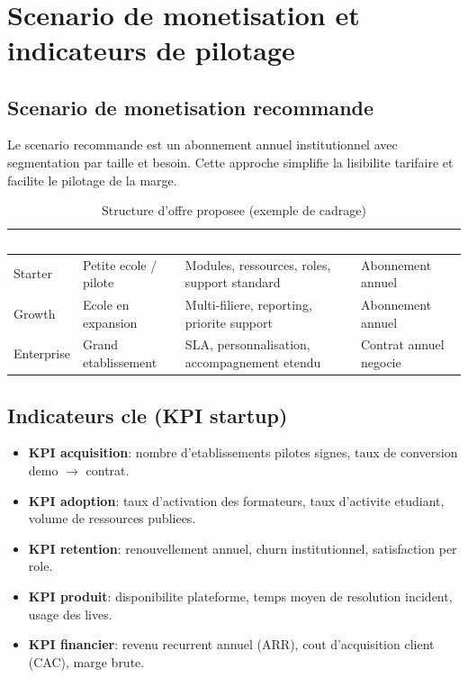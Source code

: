 ﻿﻿\documentclass[12pt,a4paper,oneside]{report}
\begin{document}
\section{Scenario de monetisation et indicateurs de pilotage}

\subsection{Scenario de monetisation recommande}

Le scenario recommande est un abonnement annuel institutionnel avec segmentation par taille et besoin. Cette approche simplifie la lisibilite tarifaire et facilite le pilotage de la marge.

\begin{table}[H]
\centering
\caption{Structure d'offre proposee (exemple de cadrage)}
\label{tab:offre_pricing}
\begin{tabular}{|p{3.2cm}|p{3.4cm}|p{4.0cm}|p{2.0cm}|}
\hline
\rowcolor{ustoblue}
\textcolor{white}{Formule} & \textcolor{white}{Cible} & \textcolor{white}{Valeur livree} & \textcolor{white}{Mode de prix} \\
\hline
Starter & Petite ecole / pilote & Modules, ressources, roles, support standard & Abonnement annuel \\
\hline
Growth & Ecole en expansion & Multi-filiere, reporting, priorite support & Abonnement annuel \\
\hline
Enterprise & Grand etablissement & SLA, personnalisation, accompagnement etendu & Contrat annuel negocie \\
\hline
\end{tabular}
\end{table}

\subsection{Indicateurs cle (KPI startup)}

\begin{itemize}
  \item \textbf{KPI acquisition}: nombre d'etablissements pilotes signes, taux de conversion demo $\rightarrow$ contrat.
  \item \textbf{KPI adoption}: taux d'activation des formateurs, taux d'activite etudiant, volume de ressources publiees.
  \item \textbf{KPI retention}: renouvellement annuel, churn institutionnel, satisfaction per role.
  \item \textbf{KPI produit}: disponibilite plateforme, temps moyen de resolution incident, usage des lives.
  \item \textbf{KPI financier}: revenu recurrent annuel (ARR), cout d'acquisition client (CAC), marge brute.
\end{itemize}
\end{document}
